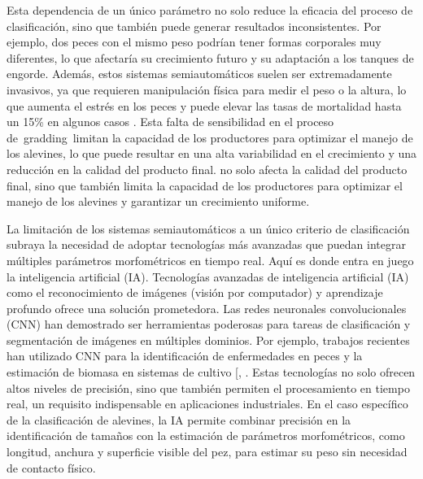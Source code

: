 \documentclass[a4paper,10pt,spanish]{jupyterBook}
\begin{document}
\sphinxAtStartPar
Esta dependencia de un único parámetro no solo reduce la eficacia del proceso de clasificación, sino que también puede generar resultados inconsistentes. Por ejemplo, dos peces con el mismo peso podrían tener formas corporales muy diferentes, lo que afectaría su crecimiento futuro y su adaptación a los tanques de engorde. Además, estos sistemas semi\sphinxhyphen{}automáticos suelen ser extremadamente invasivos, ya que requieren manipulación física para medir el peso o la altura, lo que aumenta el estrés en los peces y puede elevar las tasas de mortalidad hasta un 15\% en algunos casos . Esta falta de sensibilidad en el proceso de gradding limitan la capacidad de los productores para optimizar el manejo de los alevines, lo que puede resultar en una alta variabilidad en el crecimiento y una reducción en la calidad del producto final. no solo afecta la calidad del producto final, sino que también limita la capacidad de los productores para optimizar el manejo de los alevines y garantizar un crecimiento uniforme.

\sphinxAtStartPar
La limitación de los sistemas semi\sphinxhyphen{}automáticos a un único criterio de clasificación subraya la necesidad de adoptar tecnologías más avanzadas que puedan integrar múltiples parámetros morfométricos en tiempo real. Aquí es donde entra en juego la inteligencia artificial (IA). Tecnologías avanzadas de inteligencia artificial (IA) como el reconocimiento de imágenes (visión por computador) y aprendizaje profundo ofrece una solución prometedora. Las redes neuronales convolucionales (CNN) han demostrado ser herramientas poderosas para tareas de clasificación y segmentación de imágenes en múltiples dominios. Por ejemplo, trabajos recientes han utilizado CNN para la identificación de enfermedades en peces y la estimación de biomasa en sistemas de cultivo {[}, \sphinxhref{https://www.researchgate.net/publication/384679490\_A\_Convolutional\_Neural\_Network\_Approach\_for\_Precision\_Fish\_Disease\_Detection}{Haddad et al., 2024}{]}. Estas tecnologías no solo ofrecen altos niveles de precisión, sino que también permiten el procesamiento en tiempo real, un requisito indispensable en aplicaciones industriales. En el caso específico de la clasificación de alevines, la IA permite combinar precisión en la identificación de tamaños con la estimación de parámetros morfométricos, como longitud, anchura y superficie visible del pez, para estimar su peso sin necesidad de contacto físico.
\end{document}
